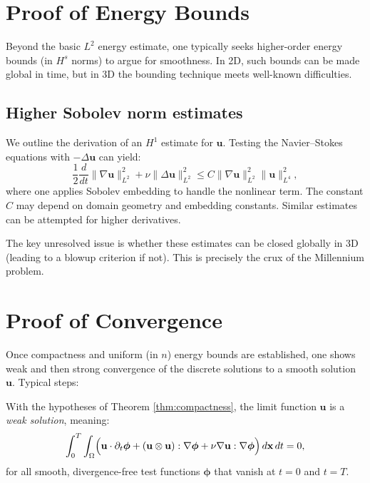 \documentclass[11pt]{article}
\numberwithin{equation}{section}
\begin{document}
\section{Proof of Energy Bounds}\label{sec:energy_bounds}

Beyond the basic \(L^2\) energy estimate, one typically seeks higher-order energy
bounds (in \(H^s\) norms) to argue for smoothness. In 2D, such bounds can be made
global in time, but in 3D the bounding technique meets well-known difficulties.

\subsection{Higher Sobolev norm estimates}

We outline the derivation of an \(H^1\) estimate for \(\mathbf{u}\). Testing the
Navier--Stokes equations with \(-\Delta \mathbf{u}\) can yield:
\[
\frac{1}{2}\frac{d}{dt} \|\nabla \mathbf{u}\|_{L^2}^2 + \nu \|\Delta \mathbf{u}\|_{L^2}^2
  \le C \|\nabla \mathbf{u}\|_{L^2}^2 \|\mathbf{u}\|_{L^4}^2,
\]
where one applies Sobolev embedding to handle the nonlinear term. The constant \(C\)
may depend on domain geometry and embedding constants. Similar estimates can be
attempted for higher derivatives.

\begin{remark}
The key unresolved issue is whether these estimates can be closed globally in 3D
(leading to a blowup criterion if not). This is precisely the crux
of the Millennium problem.
\end{remark}

\section{Proof of Convergence}\label{sec:conv_proof}

Once compactness and uniform (in \(n\)) energy bounds are established, one shows
weak and then strong convergence of the discrete solutions to a smooth solution
\(\mathbf{u}\). Typical steps:

\begin{theorem}
With the hypotheses of Theorem \ref{thm:compactness}, the limit function \(\mathbf{u}\)
is a \emph{weak solution}, meaning:
\[
\int_0^T \int_\Omega \Bigl(
  \mathbf{u}\cdot \partial_t \boldsymbol{\phi}
  + (\mathbf{u} \otimes \mathbf{u}): \nabla \boldsymbol{\phi}
  + \nu \nabla \mathbf{u} : \nabla \boldsymbol{\phi}
\Bigr) \, d\mathbf{x}\, dt = 0,
\]
for all smooth, divergence-free test functions \(\boldsymbol{\phi}\) that vanish at \(t=0\)
and \(t=T\).
\end{theorem}
\end{document}
